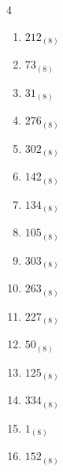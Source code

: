 \begin{multicols}{4}
\begin{enumerate}
  \item $212_{(8)}$

        \phantom{$=138$}

  \item $73_{(8)}$

        \phantom{$=59$}

  \item $31_{(8)}$

        \phantom{$=25$}

  \item $276_{(8)}$

        \phantom{$=190$}

  \item $302_{(8)}$

        \phantom{$=194$}

  \item $142_{(8)}$

        \phantom{$=98$}

  \item $134_{(8)}$

        \phantom{$=92$}

\columnbreak %

  \item $105_{(8)}$

        \phantom{$=69$}

  \item $303_{(8)}$

        \phantom{$=195$}

  \item $263_{(8)}$

        \phantom{$=179$}

  \item $227_{(8)}$

        \phantom{$=151$}

  \item $50_{(8)}$

        \phantom{$=40$}

  \item $125_{(8)}$

        \phantom{$=85$}

  \item $334_{(8)}$

        \phantom{$=220$}

  \item $1_{(8)}$

        \phantom{$=1$}

  \item $152_{(8)}$


\end{enumerate}
\end{multicols}
